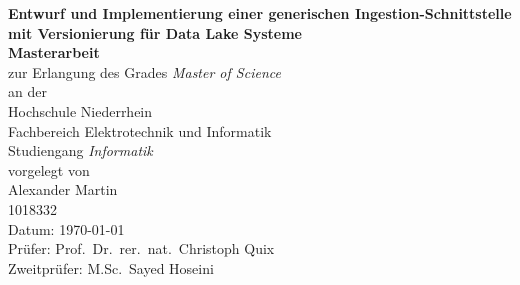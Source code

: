 \begin{titlepage}
  \begin{center}
    {\Large\bf Entwurf und Implementierung einer generischen Ingestion-Schnittstelle mit Versionierung für Data Lake Systeme}\\[2cm]

    {\bf Masterarbeit}\\
    zur Erlangung des Grades {\em Master of Science}\\[1cm]

    an der\\
    Hochschule Niederrhein\\
    Fachbereich Elektrotechnik und Informatik\\
    Studiengang {\em Informatik}\\[2cm]

    vorgelegt von\\
    Alexander Martin\\
    1018332\\[3cm]
    Datum: \today\\[2cm]

    Prüfer: Prof.~Dr.~rer.~nat.~Christoph Quix\\
    Zweitprüfer: M.Sc.~Sayed Hoseini

  \end{center}
\end{titlepage}